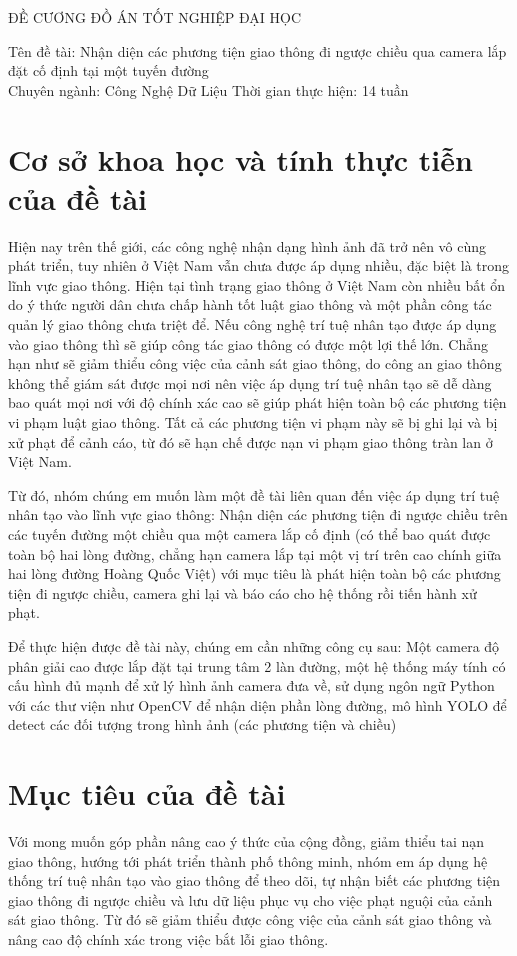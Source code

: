 \documentclass[12pt,twoside,a4paper]{article}
\begin{document}
	

\pagebreak

\large


\pagebreak

\begin{center}
ĐỀ CƯƠNG ĐỒ ÁN TỐT NGHIỆP ĐẠI HỌC
\end{center}
Tên đề tài: Nhận diện các phương tiện giao thông đi ngược chiều qua camera lắp đặt cố định tại một tuyến đường\\
Chuyên ngành: Công Nghệ Dữ Liệu
Thời gian thực hiện: 14 tuần


\section{Cơ sở khoa học và tính thực tiễn của đề tài}
Hiện nay trên thế giới, các công nghệ nhận dạng hình ảnh đã trở nên vô cùng phát triển, tuy nhiên ở Việt Nam vẫn chưa được áp dụng nhiều, đặc biệt là trong lĩnh vực giao thông. Hiện tại tình trạng giao thông ở Việt Nam còn nhiều bất ổn do ý thức người dân chưa chấp hành tốt luật giao thông và một phần công tác quản lý giao thông chưa triệt để. Nếu công nghệ trí tuệ nhân tạo được áp dụng vào giao thông thì sẽ giúp công tác giao thông có được một lợi thế lớn. Chẳng hạn như sẽ giảm thiểu công việc của cảnh sát giao thông, do công an giao thông không thể giám sát được mọi nơi nên việc áp dụng trí tuệ nhân tạo sẽ dễ dàng bao quát mọi nơi với độ chính xác cao sẽ giúp phát hiện toàn bộ các phương tiện vi phạm luật giao thông. Tất cả các phương tiện vi phạm này sẽ bị ghi lại và bị xử phạt để cảnh cáo, từ đó sẽ hạn chế được nạn vi phạm giao thông tràn lan ở Việt Nam.
\par
Từ đó, nhóm chúng em muốn làm một đề tài liên quan đến việc áp dụng trí tuệ nhân tạo vào lĩnh vực giao thông: Nhận diện các phương tiện đi ngược chiều trên các tuyến đường một chiều qua một camera lắp cố định (có thể bao quát được toàn bộ hai lòng đường, chẳng hạn camera lắp tại một vị trí trên cao chính giữa hai lòng đường Hoàng Quốc Việt) với mục tiêu là phát hiện toàn bộ các phương tiện đi ngược chiều, camera ghi lại và báo cáo cho hệ thống rồi tiến hành xử phạt.
\par
Để thực hiện được đề tài này, chúng em cần những công cụ sau: Một camera độ phân giải cao được lắp đặt tại trung tâm 2 làn đường, một hệ thống máy tính có cấu hình đủ mạnh để xử lý hình ảnh camera đưa về, sử dụng ngôn ngữ Python với các thư viện như OpenCV để nhận diện phần lòng đường, mô hình YOLO để detect các đối tượng trong hình ảnh (các phương tiện và chiều)
\section{Mục tiêu của đề tài}
Với mong muốn góp phần nâng cao ý thức của cộng đồng, giảm thiểu tai nạn giao thông, hướng tới phát triển thành phố thông minh, nhóm em áp dụng hệ thống trí tuệ nhân tạo vào giao thông để theo dõi, tự nhận biết các phương tiện giao thông đi ngược chiều và lưu dữ liệu phục vụ cho việc phạt nguội của cảnh sát giao thông. Từ đó sẽ giảm thiểu được công việc của cảnh sát giao thông và nâng cao độ chính xác trong việc bắt lỗi giao thông.
\end{document}
